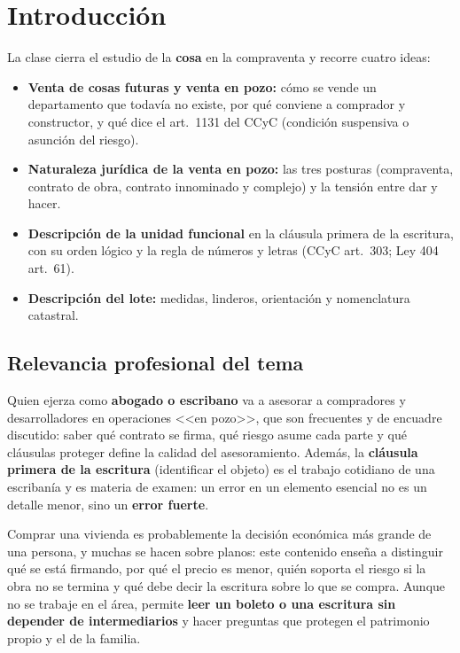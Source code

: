 \documentclass[12pt,oneside]{book}
\begin{document}

\chapter*{Introducción}

La clase cierra el estudio de la \textbf{cosa} en la compraventa y recorre cuatro ideas:

\begin{itemize}
    \item \textbf{Venta de cosas futuras y venta en pozo:} cómo se vende un departamento que todavía no existe, por qué conviene a comprador y constructor, y qué dice el art.~1131 del CCyC (condición suspensiva o asunción del riesgo).
    \item \textbf{Naturaleza jurídica de la venta en pozo:} las tres posturas (compraventa, contrato de obra, contrato innominado y complejo) y la tensión entre dar y hacer.
    \item \textbf{Descripción de la unidad funcional} en la cláusula primera de la escritura, con su orden lógico y la regla de números y letras (CCyC art.~303; Ley 404 art.~61).
    \item \textbf{Descripción del lote:} medidas, linderos, orientación y nomenclatura catastral.
\end{itemize}

\section{Relevancia profesional del tema}

Quien ejerza como \textbf{abogado o escribano} va a asesorar a compradores y desarrolladores en operaciones <<en pozo>>, que son frecuentes y de encuadre discutido: saber qué contrato se firma, qué riesgo asume cada parte y qué cláusulas proteger define la calidad del asesoramiento. Además, la \textbf{cláusula primera de la escritura} (identificar el objeto) es el trabajo cotidiano de una escribanía y es materia de examen: un error en un elemento esencial no es un detalle menor, sino un \textbf{error fuerte}.

Comprar una vivienda es probablemente la decisión económica más grande de una persona, y muchas se hacen sobre planos: este contenido enseña a distinguir qué se está firmando, por qué el precio es menor, quién soporta el riesgo si la obra no se termina y qué debe decir la escritura sobre lo que se compra. Aunque no se trabaje en el área, permite \textbf{leer un boleto o una escritura sin depender de intermediarios} y hacer preguntas que protegen el patrimonio propio y el de la familia.
\end{document}
